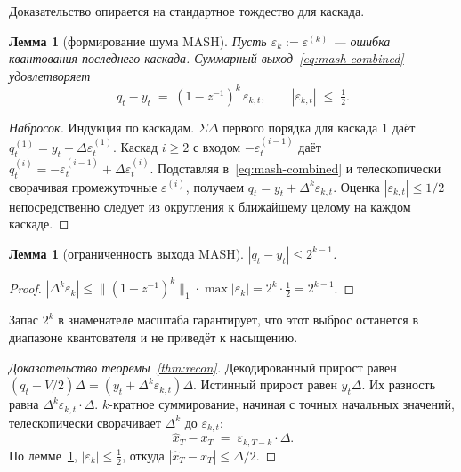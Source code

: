 \documentclass[11pt]{article}
\newtheorem{lemma}[theorem]{Лемма}
\theoremstyle{remark}
\begin{document}
Доказательство опирается на стандартное тождество для каскада.

\begin{lemma}[формирование шума MASH]
\label{lem:mash-bound}
Пусть $\varepsilon_k := \varepsilon^{(k)}$ --- ошибка квантования
последнего каскада. Суммарный выход~\eqref{eq:mash-combined}
удовлетворяет
\begin{equation}
q_t - y_t \;=\; (1 - z^{-1})^k \, \varepsilon_{k,t}, \qquad
|\varepsilon_{k,t}| \;\le\; \tfrac{1}{2}.
\end{equation}
\end{lemma}

\begin{proof}[Набросок]
Индукция по каскадам. $\Sigma\Delta$ первого порядка для каскада 1
даёт $q^{(1)}_t = y_t + \Delta \varepsilon^{(1)}_t$. Каскад $i \ge 2$ с
входом $-\varepsilon^{(i-1)}_t$ даёт $q^{(i)}_t = -\varepsilon^{(i-1)}_t
+ \Delta \varepsilon^{(i)}_t$. Подставляя в~\eqref{eq:mash-combined} и
телескопически сворачивая промежуточные $\varepsilon^{(i)}$, получаем
$q_t = y_t + \Delta^k \varepsilon_{k,t}$. Оценка $|\varepsilon_{k,t}|
\le 1/2$ непосредственно следует из округления к ближайшему целому на
каждом каскаде.
\end{proof}

\begin{lemma}[ограниченность выхода MASH]
\label{lem:mash-range}
$|q_t - y_t| \le 2^{k-1}$.
\end{lemma}

\begin{proof}
$|\Delta^k \varepsilon_k| \le \|(1-z^{-1})^k\|_1 \cdot \max|\varepsilon_k|
= 2^k \cdot \tfrac{1}{2} = 2^{k-1}$.
\end{proof}

Запас $2^k$ в знаменателе масштаба гарантирует, что этот выброс
останется в диапазоне квантователя и не приведёт к насыщению.

\begin{proof}[Доказательство теоремы~\ref{thm:recon}]
Декодированный прирост равен $(q_t - V/2)\Delta = (y_t + \Delta^k
\varepsilon_{k,t})\Delta$. Истинный прирост равен $y_t \Delta$. Их
разность равна $\Delta^k \varepsilon_{k,t} \cdot \Delta$. $k$-кратное
суммирование, начиная с точных начальных значений, телескопически
сворачивает $\Delta^k$ до $\varepsilon_{k,t}$:
\begin{equation}
\hat x_T - x_T \;=\; \varepsilon_{k,T-k} \cdot \Delta.
\end{equation}
По лемме~\ref{lem:mash-bound}, $|\varepsilon_k| \le \tfrac{1}{2}$,
откуда $|\hat x_T - x_T| \le \Delta/2$.
\end{proof}
\end{document}
